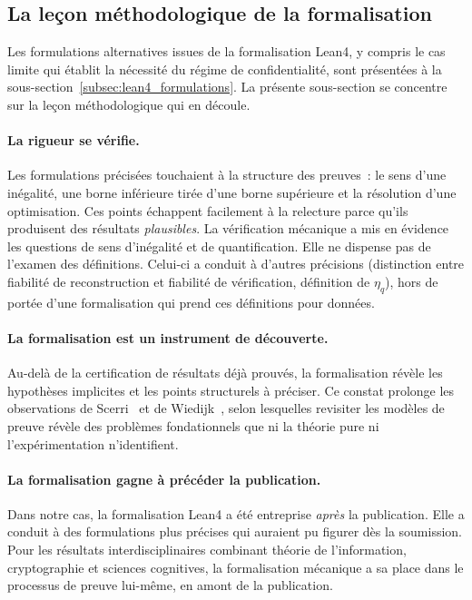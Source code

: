 \subsection{La le\c{c}on m\'ethodologique de la formalisation}
\label{subsec:verification_precise_lecon}
\begin{sloppypar}

Les formulations alternatives issues de la formalisation Lean4, y compris le
cas limite qui \'etablit la n\'ecessit\'e du r\'egime de confidentialit\'e, sont
pr\'esent\'ees \`a la sous-section~\ref{subsec:lean4_formulations}. La pr\'esente
sous-section se concentre sur la le\c{c}on m\'ethodologique qui en d\'ecoule.

\paragraph{La rigueur se v\'erifie.}
Les formulations pr\'ecis\'ees touchaient \`a la structure des preuves~: le sens
d'une in\'egalit\'e, une borne inf\'erieure tir\'ee d'une borne sup\'erieure et la
r\'esolution d'une optimisation. Ces points \'echappent facilement \`a la relecture
parce qu'ils produisent des r\'esultats \emph{plausibles}. La v\'erification
m\'ecanique a mis en \'evidence les questions de sens d'in\'egalit\'e et de
quantification. Elle ne dispense pas de l'examen des d\'efinitions. Celui-ci a conduit
\`a d'autres pr\'ecisions (distinction entre fiabilit\'e de reconstruction et
fiabilit\'e de v\'erification, d\'efinition de $\eta_q$), hors de port\'ee d'une
formalisation qui prend ces d\'efinitions pour donn\'ees.

\paragraph{La formalisation est un instrument de d\'ecouverte.}
Au-del\`a de la certification de r\'esultats d\'ej\`a prouv\'es, la formalisation
r\'ev\`ele les hypoth\`eses implicites et les points structurels \`a pr\'eciser. Ce
constat prolonge les observations de Scerri~\cite{Scerri14} et de
Wiedijk~\cite{Wiedijk2008}, selon lesquelles revisiter les mod\`eles de preuve
r\'ev\`ele des probl\`emes fondationnels que ni la th\'eorie pure ni
l'exp\'erimentation n'identifient.

\paragraph{La formalisation gagne \`a pr\'ec\'eder la publication.}
Dans notre cas, la formalisation Lean4 a \'et\'e entreprise \emph{apr\`es} la
publication. Elle a conduit \`a des formulations plus pr\'ecises qui auraient pu
figurer d\`es la soumission. Pour les r\'esultats interdisciplinaires combinant
th\'eorie de l'information, cryptographie et sciences cognitives, la
formalisation m\'ecanique a sa place dans le processus de preuve lui-m\^eme, en
amont de la publication.


\end{sloppypar}
